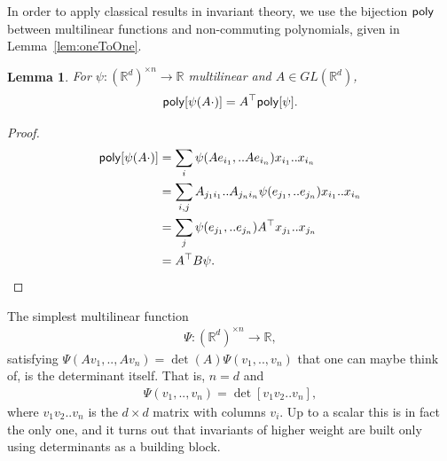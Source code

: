 \documentclass{scrartcl}
\theoremstyle{plain}
\newtheorem{lemma}[theorem]{Lemma}
\theoremstyle{definition}
\newcommand{\R}{\mathbb{R}}
\newcommand{\1}[1]{1_{\{#1\}}}
\newcommand{\TODO}[1]{ \textbf{\color{Orange}(TODO #1)} }
\newcommand{\ds}{d} %
\begin{document}


In order to apply classical results in invariant theory, we use the
bijection $\mathsf{poly}$ between multilinear functions and non-commuting polynomials,
given in Lemma~\ref{lem:oneToOne}.
%
\begin{lemma}
  \label{lem:multi}
  For $\psi: (\R^d)^{\times n} \to \R$ multilinear
  and
  $A \in GL(\R^d)$,
  \begin{align*}
    \mathsf{poly}[ \psi( A \cdot ) ] = A^\top \mathsf{poly}[ \psi ].
  \end{align*}
\end{lemma}
\begin{proof}
  \begin{align*}
    \mathsf{poly}[ \psi( A \cdot ) ]
    &=
    \sum_i \psi( A e_{i_1}, .. A e_{i_n} ) x_{i_1} .. x_{i_n} \\
    &=
    \sum_{i,j} A_{j_1 i_1} .. A_{j_n i_n} \psi( e_{j_1}, .. e_{j_n} ) x_{i_1} .. x_{i_n} \\
    &=
    \sum_{j} \psi( e_{j_1}, .. e_{j_n} ) A^\top x_{j_1} .. x_{j_n} \\
    &=
    A^\top B \psi.
  \end{align*}
\end{proof}


The simplest multilinear function
\begin{align*}
  \Psi: (\R^d)^{\times n} \to \R,
\end{align*}
satisfying $\Psi( A v_1, .., A v_n ) = \det( A ) \Psi(v_1, .., v_n)$
that one can maybe think of, is the determinant itself. That is, $n=\ds$ and
\begin{align*}
  \Psi(v_1,..,v_n) = \det[ v_1 v_2 .. v_n ],
\end{align*}
where $v_1 v_2 .. v_n$ is the $d \times d$ matrix with columns $v_i$.
%
Up to a scalar this is in fact the only one, and it turns out that invariants of higher weight are
built only using determinants as a building block.

\end{document}
